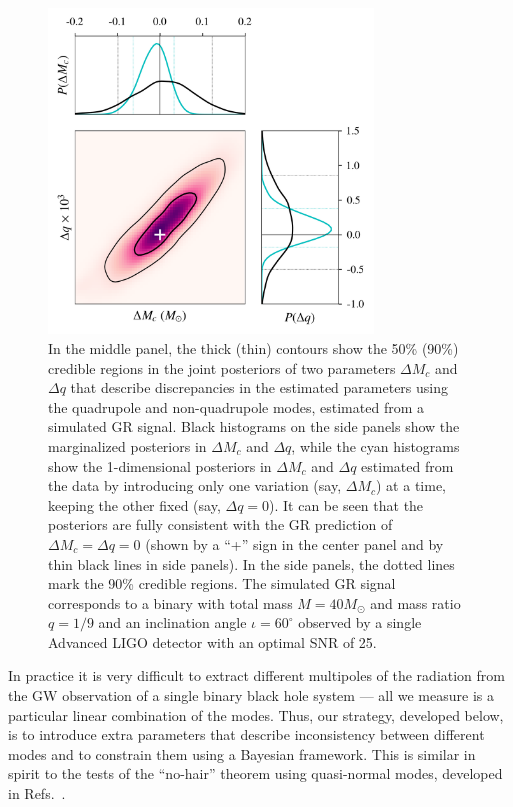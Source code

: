 \documentclass[prl,preprintnumbers,twocolumn,eqsecnum,floatfix,a4paper,nofootinbib,superscriptaddress]{revtex4}
\begin{document}
\begin{figure}[htb] \begin{center}
\includegraphics[width=3.4in]{figs/fig1_gr_9dim_abhi.png}
\caption{In the middle panel, the thick (thin) contours show the 50\% (90\%) credible regions in the joint posteriors of two parameters $\Delta M_c$ and $\Delta q$ that describe discrepancies in the estimated parameters using the quadrupole and non-quadrupole modes, estimated from a simulated GR signal. Black histograms on the side panels show the marginalized posteriors in $\Delta M_c$ and $\Delta q$, while the cyan histograms show the 1-dimensional posteriors in $\Delta M_c$ and $\Delta q$ estimated from the data by introducing only one variation (say, $\Delta M_c$) at a time, keeping the other fixed (say, $\Delta q = 0$). It can be seen that the posteriors are fully consistent with the GR prediction of $\Delta M_c = \Delta q = 0$ (shown by a ``+'' sign in the center panel and by thin black lines in side panels). In the side panels, the dotted lines mark the 90\% credible regions. The simulated GR signal corresponds to a binary with total mass $M = {40}M_\odot$ and mass ratio $q = 1/9$ and an inclination angle $\iota = {60^\circ}$ observed by a single Advanced LIGO detector with an optimal SNR of 25. }
\label{fig:contour_plots}
\end{center} \end{figure}
In practice it is very difficult to extract different multipoles of the radiation from the GW observation of a single binary black hole system --- all we measure is a particular linear combination of the modes. Thus, our strategy, developed below, is to introduce extra parameters that describe inconsistency between different modes and to constrain them using a Bayesian framework. This is similar in spirit to the tests of the ``no-hair'' theorem using quasi-normal modes, developed in Refs.~\cite{Gossan:2011ha,Meidam:2014jpa}.
\end{document}
